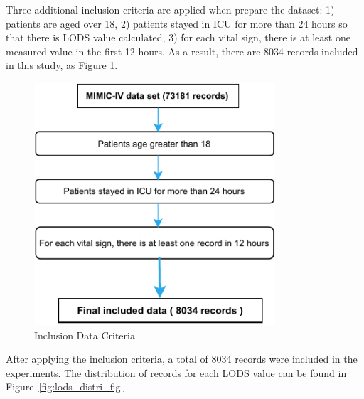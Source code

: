 \documentclass[12pt,a4paper,english
]{tunithesis}
\begin{document}
Three additional inclusion criteria are applied when prepare the dataset: 1) patients are aged over 18, 2) patients stayed in ICU for more than 24 hours so that there is LODS value calculated, 3) for each vital sign, there is at least one measured value in the first 12 hours. As a result, there are 8034 records included in this study, as Figure \ref{fig:include_criteria}.

\begin{figure}
  \begin{center}
    \includegraphics[width=0.8\textwidth]{thesis/img/include_criteria.pdf}
  \end{center}
  \caption[Inclusion Criteria]{Inclusion Data Criteria}
  \label{fig:include_criteria}
\end{figure}

After applying the inclusion criteria, a total of 8034 records were included in the experiments. The distribution of records for each LODS value can be found in Figure~\ref{fig:lods_distri_fig}
\end{document}
